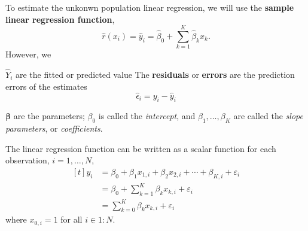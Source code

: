 \documentclass[]{book}
\renewcommand{\vec}[1]{\boldsymbol{#1}}
\begin{document}
To estimate the unkonwn population linear regression, we will use the
\textbf{sample linear regression function}, \[
\hat{r}(x_i) = \hat{y}_i = \hat\beta_0 + \sum_{k = 1}^{K} \hat\beta_{k} x_k .
\] However, we

\(\hat{Y}_i\) are the fitted or predicted value The \textbf{residuals}
or \textbf{errors} are the prediction errors of the estimates \[
\hat{\epsilon}_i = y_i - \hat{y}_i
\]

\(\vec{\beta}\) are the parameters; \(\beta_0\) is called the
\emph{intercept}, and \(\beta_{1}, \dots, \beta_{K}\) are called the
\emph{slope parameters}, or \emph{coefficients}.

The linear regression function can be written as a scalar function for
each observation, \(i = 1, \dots, N\), \[
\begin{aligned}[t]
y_i &= \beta_0 + \beta_1 x_{1,i} + \beta_2 x_{2,i} + \cdots + \beta_{K,i} + \varepsilon_i \\
 &= \beta_0 + \sum_{k = 1}^{K} \beta_k x_{k,i} + \varepsilon_i \\
&= \sum_{k = 0}^{K} \beta_k x_{k,i} + \varepsilon_i
\end{aligned}
\] where \(x_{0,i} = 1\) for all \(i \in 1:N\).
\end{document}
